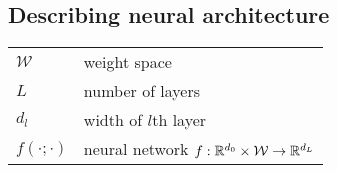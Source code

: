 \subsection*{Describing neural architecture}
\bgroup
\def\arraystretch{1.5}
\begin{tabular}{p{1in}p{4in}}
$\displaystyle \mathcal{W}$ & weight space\\
$L$ & number of layers\\
$\displaystyle d_l$ & width of $l$th layer\\
$\displaystyle f(\cdot;\cdot)$ & neural network $f: \mathbb{R}^{d_0}\times\mathcal{W}\to\mathbb{R}^{d_L}$\\
\end{tabular}
\egroup